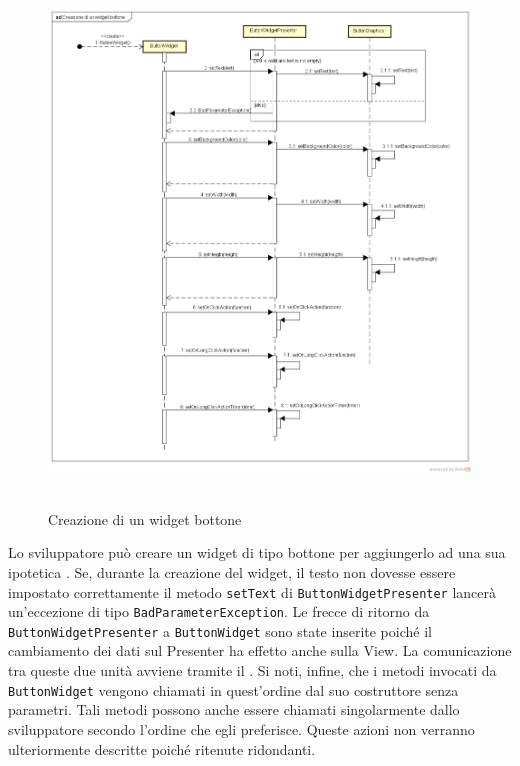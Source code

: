 \label{Creazione di un widget bottone}
\begin{figure}[ht]
	\centering
	\includegraphics[width=16cm, height=14cm]{Sezioni/Diagrammi/img/Creazione di un widget bottone.png}
	\caption{Creazione di un widget bottone}
\end{figure}

Lo sviluppatore può creare un widget di tipo bottone per aggiungerlo ad una sua ipotetica . Se, durante la creazione del widget, il testo non dovesse essere impostato correttamente il metodo \texttt{setText} di \texttt{ButtonWidgetPresenter} lancerà un'eccezione di tipo \texttt{BadParameterException}.
Le frecce di ritorno da \texttt{ButtonWidgetPresenter}  a \texttt{ButtonWidget} sono state inserite poiché il cambiamento dei dati sul Presenter ha effetto anche sulla View. La comunicazione tra queste due unità avviene tramite il  .
Si noti, infine, che i metodi invocati da \texttt{ButtonWidget} vengono chiamati in quest'ordine dal suo costruttore senza parametri. Tali metodi possono anche essere chiamati singolarmente dallo sviluppatore secondo l'ordine che egli preferisce. Queste azioni non verranno ulteriormente descritte poiché ritenute ridondanti.

\newpage

